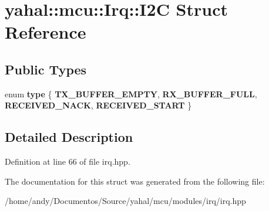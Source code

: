 \hypertarget{structyahal_1_1mcu_1_1_irq_1_1_i2_c}{}\section{yahal\+:\+:mcu\+:\+:Irq\+:\+:I2\+C Struct Reference}
\label{structyahal_1_1mcu_1_1_irq_1_1_i2_c}
\subsection*{Public Types}
\begin{DoxyCompactItemize}
\item 
\hypertarget{structyahal_1_1mcu_1_1_irq_1_1_i2_c_acd51c57af795744492ee0c003e79318a}{}enum {\bfseries type} \{ {\bfseries T\+X\+\_\+\+B\+U\+F\+F\+E\+R\+\_\+\+E\+M\+P\+T\+Y}, 
{\bfseries R\+X\+\_\+\+B\+U\+F\+F\+E\+R\+\_\+\+F\+U\+L\+L}, 
{\bfseries R\+E\+C\+E\+I\+V\+E\+D\+\_\+\+N\+A\+C\+K}, 
{\bfseries R\+E\+C\+E\+I\+V\+E\+D\+\_\+\+S\+T\+A\+R\+T}
 \}\label{structyahal_1_1mcu_1_1_irq_1_1_i2_c_acd51c57af795744492ee0c003e79318a}

\end{DoxyCompactItemize}


\subsection{Detailed Description}


Definition at line 66 of file irq.\+hpp.



The documentation for this struct was generated from the following file\+:\begin{DoxyCompactItemize}
\item 
/home/andy/\+Documentos/\+Source/yahal/mcu/modules/irq/irq.\+hpp\end{DoxyCompactItemize}
